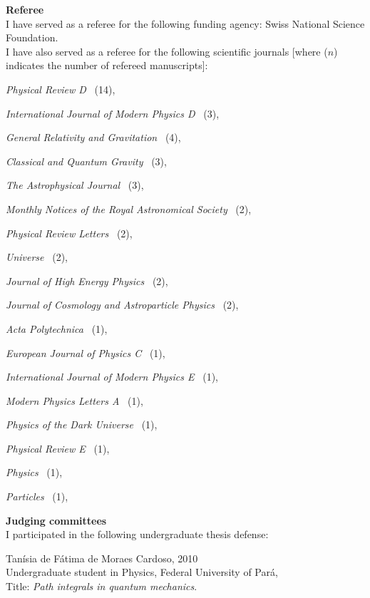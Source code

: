 \documentclass[10pt]{article}
\newcommand{\blankline}{\quad\pagebreak[3]}
\begin{document}
\textbf{Referee} \\
I have served as a referee for the following funding agency:
Swiss National Science Foundation. \\

I have also served as a referee for the following scientific journals [where ($n$)
indicates the number of refereed manuscripts]:
\blankline
\vspace{0.25cm}
\begin{innerlist}
    \item \emph{Physical Review D} \dotfill\, (14),
    \item \emph{International Journal of Modern Physics D} \dotfill\, (3),
    \item \emph{General Relativity and Gravitation} \dotfill\, (4),
    \item \emph{Classical and Quantum Gravity} \dotfill\, (3),
    \item \emph{The Astrophysical Journal} \dotfill\, (3),
    \item \emph{Monthly Notices of the Royal Astronomical Society} \dotfill\, (2),
    \item \emph{Physical Review Letters} \dotfill\, (2),
    \item \emph{Universe} \dotfill\, (2),
    \item \emph{Journal of High Energy Physics} \dotfill\, (2),
    \item \emph{Journal of Cosmology and Astroparticle Physics} \dotfill\, (2),
    \item \emph{Acta Polytechnica} \dotfill\, (1),
    \item \emph{European Journal of Physics C} \dotfill\, (1),
    \item \emph{International Journal of Modern Physics E} \dotfill\, (1),
    \item \emph{Modern Physics Letters A} \dotfill\, (1),
    \item \emph{Physics of the Dark Universe} \dotfill\, (1),
    \item \emph{Physical Review E} \dotfill\, (1),
    \item \emph{Physics} \dotfill\, (1),
    \item \emph{Particles} \dotfill\, (1),
\end{innerlist}

\blankline

\textbf{Judging committees} \\
I participated in the following undergraduate thesis defense:
\begin{bibenum}
    \item {Tan\'isia de F\'atima de Moraes Cardoso}, \hfill{2010} \\
        Undergraduate student in Physics, Federal University of Par\'a, \\
        Title: \emph{Path integrals in quantum mechanics}.
\end{bibenum}
\end{document}
